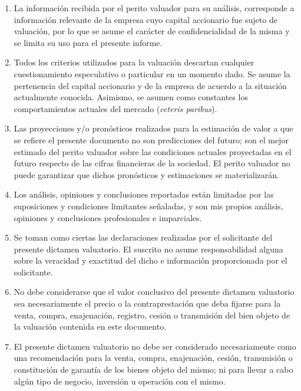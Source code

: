 \begin{enumerate}[\indent a)]
\item La información recibida por el perito valuador para su análisis, corresponde a información relevante de la empresa cuyo capital accionario fue sujeto de valuación, por lo que se asume el carácter de confidencialidad de la misma y se limita su uso para el presente informe.

\item Todos los criterios utilizados para la valuación descartan cualquier cuestionamiento especulativo o particular en un momento dado. Se asume la pertenencia del capital accionario y de la empresa de acuerdo a la situación actualmente conocida. Asimismo, se asumen como constantes los comportamientos actuales del mercado (\textit{ceteris paribus}).

\item Las proyecciones y/o pronósticos realizados para la estimación de valor a que se refiere el presente documento no son predicciones del futuro; son el mejor estimado del perito valuador sobre las condiciones actuales proyectadas en el futuro respecto de las cifras financieras de la sociedad. El perito valuador no puede garantizar que dichos pronósticos y estimaciones se materializarán.

\item Los análisis, opiniones y conclusiones reportadas están limitadas por las suposiciones y condiciones limitantes señaladas, y son mis propios análisis, opiniones y conclusiones profesionales e imparciales.

\item Se toman como ciertas las declaraciones realizadas por el solicitante del presente dictamen valuatorio. El suscrito no asume responsabilidad alguna sobre la veracidad y exactitud del dicho e información proporcionada por el solicitante.

\item No debe considerarse que el valor conclusivo del presente dictamen valuatorio sea necesariamente el precio o la contraprestación que deba fijarse para la venta, compra, enajenación, registro, cesión o transmisión del bien objeto de la valuación   contenida en este documento.

\item El presente dictamen valuatorio no debe ser considerado necesariamente como una recomendación para la venta, compra, enajenación, cesión, transmisión o constitución de garantía de los bienes objeto del mismo; ni para llevar a cabo algún tipo de negocio, inversión u operación con el mismo.


\end{enumerate}
